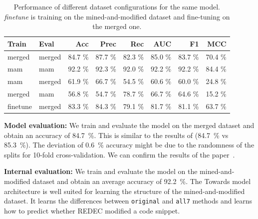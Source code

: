 \documentclass[%
class=scrreprt,
chapterprefix=false,%
open=right,%
twoside=true,%
paper=a4,%
logofile={Logo\_zentral\_farbig\_EN.png},%
thesistype=master,%
UKenglish,%
]{se2thesis}
\theoremstyle{definition}
\newcommand{\rdh}{REDEC\xspace}
\begin{document}
	\begin{table}[tb]
		\centering
		\caption{Performance of different dataset configurations for the same model. 
		\textit{finetune} is training on the mined-and-modified dataset and fine-tuning on the merged one.
		}
		\label{tab:dataset_performance}
		\begin{tabular}{llrrrrrr}
			\toprule
			Train & Eval & Acc & Prec & Rec & AUC & F1 & MCC \\
			\midrule
			merged      & merged   	& 84.7 \% & 87.7 \% & 82.3 \% & 85.0 \% & 83.7 \% & 70.4 \% \\
			mam        	& mam    	& 92.2 \% & 92.3 \% & 92.0 \% & 92.2 \% & 92.2 \% & 84.4 \% \\
			mam			& merged    & 61.9 \% & 66.7 \% & 54.5 \% & 60.6 \% & 60.0 \% & 24.8 \% \\
			merged      & mam	    & 56.8 \% & 54.7 \% & 78.7 \% & 66.7 \% & 64.6 \% & 15.2 \% \\
			finetune	& merged    & 83.3 \% & 84.3 \% & 79.1 \% & 81.7 \% & 81.1 \% & 63.7 \% \\
			\bottomrule
		\end{tabular}
	\end{table}

	\textbf{Model evaluation:}
	We train and evaluate the model on the merged dataset and obtain an accuracy of 84.7~\%. This is similar to the results of \citeauthor{mi2022towards} (84.7~\% vs 85.3~\%). The deviation of 0.6~\% accuracy might be due to the randomness of the splits for 10-fold cross-validation. We can confirm the results of the paper~\cite{mi2022towards}.
	
	\textbf{Internal evaluation:}
	We train and evaluate the model on the mined-and-modified dataset and obtain an average accuracy of 92.2~\%.
	The Towards model architecture is well suited for learning the structure of the mined-and-modified dataset. It learns the differences between \texttt{original} and \texttt{all7} methods and learns how to predict whether \rdh modified a code snippet. 
\end{document}
